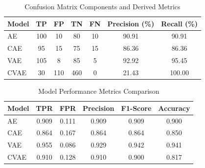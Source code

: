 \begin{table}[!htbp]
\centering
\label{tab:confusion-matrix-results}
\begin{tabular}{l
    S[table-format=3.0]
    S[table-format=3.0]
    S[table-format=3.0]
    S[table-format=3.0]
    S[table-format=3.2]
    S[table-format=3.2]
}
\toprule
\textbf{Model} & {\textbf{TP}} & {\textbf{FP}} & {\textbf{TN}} & {\textbf{FN}} & {\textbf{Precision (\%)}} & {\textbf{Recall (\%)}} \\
\midrule
{} AE   & 100 & 10 & 80 & 10 & 90.91 & 90.91 \\
CAE  & 95 & 15 & 75 & 15 & 86.36 & 86.36 \\
 VAE  & 105 & 8 & 85 & 5 & 92.92 & 95.45 \\
CVAE & 30 & 110 & 460 & 0 & 21.43 & 100.00 \\
\bottomrule
\end{tabular}
\caption{Confusion Matrix Components and Derived Metrics}
\end{table}



\begin{table}[!htbp]
\centering
\label{tab:performance-metrics}
\begin{tabular}{l
    S[table-format=1.3]
    S[table-format=1.3]
    S[table-format=1.3]
    S[table-format=1.3]
    S[table-format=1.3]
}
\toprule
\textbf{Model} & {\textbf{TPR}} & {\textbf{FPR}} & {\textbf{Precision}} & {\textbf{F1-Score}} & {\textbf{Accuracy}} \\
\midrule
{} AE   & 0.909 & 0.111 & 0.909 & 0.909 & 0.900 \\
CAE  & 0.864 & 0.167 & 0.864 & 0.864 & 0.850 \\
 VAE  & 0.955 & 0.086 & 0.929 & 0.942 & 0.941 \\
CVAE & 0.910 & 0.128 & 0.910 & 0.900 & 0.817 \\
\bottomrule
\end{tabular}
\caption{Model Performance Metrics Comparison}
\end{table}

